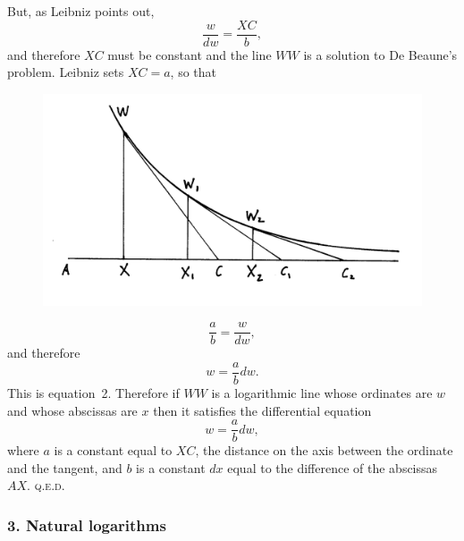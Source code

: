 \documentclass[polutonikogreek,english,twoside,openright]{article}
\begin{document}
But, as Leibniz points out,
$$\frac{w}{dw} = \frac{XC}{b},$$ and therefore $XC$ must be constant
and the line $WW$ is a solution to De Beaune's problem.  Leibniz sets
$XC =a$, so that 
 \begin{figure}[htp]
   \begin{center}
     \includegraphics[width=.85\textwidth]{fig/Figure26A}
     \caption{}
     \vspace{-10pt}
   \end{center}
\end{figure} 
$$\frac{a}{b} = \frac{w}{dw},$$
and therefore
$$w = \frac{a}{b}dw.$$
This is equation~2.  Therefore if $WW$ is a logarithmic line whose
ordinates are $w$ and whose abscissas are $x$ then it satisfies the
differential equation
$$w = \frac{a}{b}dw,$$
where $a$ is a constant equal to $XC$, the distance on the axis
between the ordinate and the tangent, and $b$ is a constant $dx$ equal
to the difference of the abscissas $AX$.  \textsc{q.e.d.}
\vspace{.5\baselineskip}


\subsubsection*{3. Natural logarithms}
\end{document}

